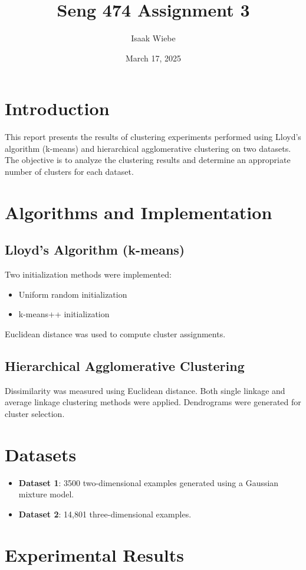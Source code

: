 \documentclass{article}
\title{Seng 474 Assignment 3}
\author{Isaak Wiebe}
\date{March 17, 2025}
\begin{document}
\maketitle

\section{Introduction}
This report presents the results of clustering experiments performed using Lloyd’s algorithm (k-means) and hierarchical agglomerative clustering on two datasets. The objective is to analyze the clustering results and determine an appropriate number of clusters for each dataset.

\section{Algorithms and Implementation}
\subsection{Lloyd’s Algorithm (k-means)}
Two initialization methods were implemented:
\begin{itemize}
    \item Uniform random initialization
    \item k-means++ initialization
\end{itemize}
Euclidean distance was used to compute cluster assignments.

\subsection{Hierarchical Agglomerative Clustering}
Dissimilarity was measured using Euclidean distance. Both single linkage and average linkage clustering methods were applied. Dendrograms were generated for cluster selection.

\section{Datasets}
\begin{itemize}
    \item \textbf{Dataset 1}: 3500 two-dimensional examples generated using a Gaussian mixture model.
    \item \textbf{Dataset 2}: 14,801 three-dimensional examples.
\end{itemize}

\section{Experimental Results}
\end{document}
